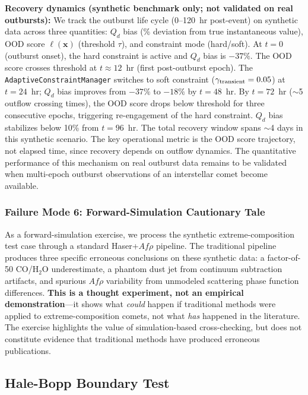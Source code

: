 \documentclass[usenatbib]{mnras}
\begin{document}
\textbf{Recovery dynamics (synthetic benchmark only; not validated on real outbursts):} We track the outburst life cycle (0--120~hr post-event) on synthetic data across three quantities: $Q_d$ bias (\% deviation from true instantaneous value), OOD score $\ell(\mathbf{x})$ (threshold $\tau$), and constraint mode (hard/soft). At $t=0$ (outburst onset), the hard constraint is active and $Q_d$ bias is $-37\%$. The OOD score crosses threshold at $t \approx 12$~hr (first post-outburst epoch). The \texttt{AdaptiveConstraintManager} switches to soft constraint ($\gamma_{\rm transient}=0.05$) at $t=24$~hr; $Q_d$ bias improves from $-37\%$ to $-18\%$ by $t=48$~hr. By $t=72$~hr ($\sim$5 outflow crossing times), the OOD score drops below threshold for three consecutive epochs, triggering re-engagement of the hard constraint. $Q_d$ bias stabilizes below 10\% from $t=96$~hr. The total recovery window spans $\sim$4 days in this synthetic scenario. The key operational metric is the OOD score trajectory, not elapsed time, since recovery depends on outflow dynamics. The quantitative performance of this mechanism on real outburst data remains to be validated when multi-epoch outburst observations of an interstellar comet become available.

\subsubsection{Failure Mode 6: Forward-Simulation Cautionary Tale}

As a forward-simulation exercise, we process the synthetic extreme-composition test case through a standard Haser+$Af\rho$ pipeline. The traditional pipeline produces three specific erroneous conclusions on these synthetic data: a factor-of-50 CO/H$_2$O underestimate, a phantom dust jet from continuum subtraction artifacts, and spurious $Af\rho$ variability from unmodeled scattering phase function differences. \textbf{This is a thought experiment, not an empirical demonstration}---it shows what \textit{could} happen if traditional methods were applied to extreme-composition comets, not what \textit{has} happened in the literature. The exercise highlights the value of simulation-based cross-checking, but does not constitute evidence that traditional methods have produced erroneous publications.

\subsection{Hale-Bopp Boundary Test}\label{sec:proxy}
\end{document}
